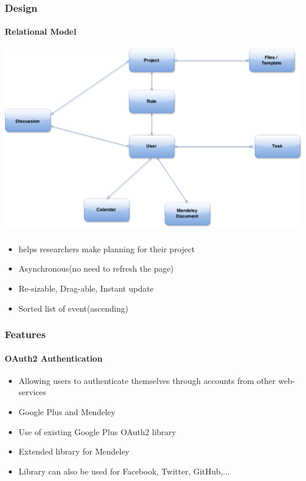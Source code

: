 \documentclass{beamer}
\begin{document}
\begin{frame}
\frametitle{Design}\framesubtitle{Relational Model}
\centering
\includegraphics[scale=0.2]{./images/RMA.png}
\end{frame}

\begin{frame}
\frametitle{}\framesubtitle{}
	\begin{itemize}
		\item helps researchers make planning for their project 
		\item Asynchronous(no need to refresh the page)
		\item Re-sizable, Drag-able, Instant update
		\item Sorted list of event(ascending) 
	\end{itemize}
\end{frame}


\begin{frame}
\frametitle{Features}
\framesubtitle{OAuth2 Authentication}
	\begin{itemize}
		\item Allowing users to authenticate themselves through accounts from other web-services
		\item Google Plus and Mendeley
		\item Use of existing Google Plus OAuth2 library
		\item Extended library for Mendeley
		\item Library can also be used for Facebook, Twitter, GitHub,...
	\end{itemize}
\end{frame}
\end{document}
